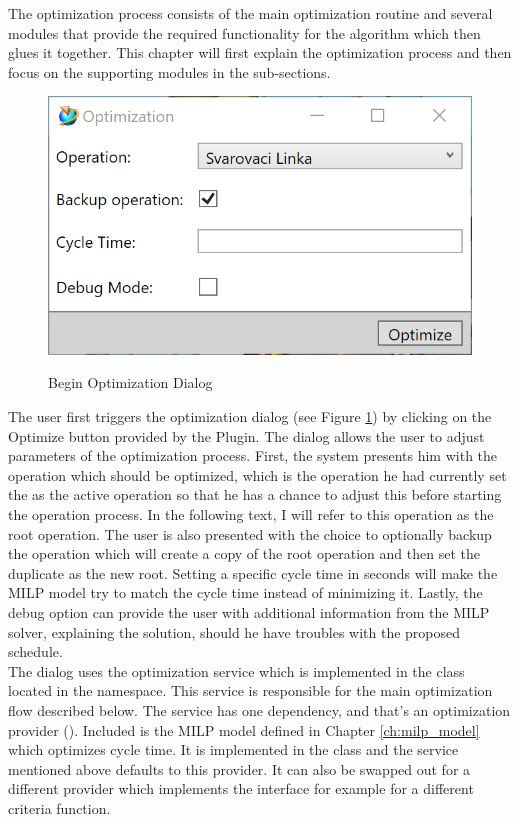 The optimization process consists of the main optimization routine and several modules that provide the required functionality for the algorithm which then glues it together. This chapter will first explain the optimization process and then focus on the supporting modules in the sub-sections. \\

\begin{figure}[ht]
	\caption{Begin Optimization Dialog}
	\centering
	\includegraphics{dialog_beginoptimization}
	\label{fig:DialogBeginOptimization}
\end{figure}

The user first triggers the optimization dialog (see Figure \ref{fig:DialogBeginOptimization}) by clicking on the Optimize button provided by the Plugin. 
The dialog allows the user to adjust parameters of the optimization process. 
First, the system presents him with the operation which should be optimized, which is the operation he had currently set the as the active operation so that he has a chance to adjust this before starting the operation process. In the following text, I will refer to this operation as the root operation.
The user is also presented with the choice to optionally backup the operation which will create a copy of the root operation and then set the duplicate as the new root.
Setting a specific cycle time in seconds will make the MILP model try to match the cycle time instead of minimizing it.
Lastly, the debug option can provide the user with additional information from the MILP solver, explaining the solution, should he have troubles with the proposed schedule. \\

The dialog uses the optimization service which is implemented in the  class located in the  namespace. This service is responsible for the main optimization flow described below. The service has one dependency, and that's an optimization provider (). Included is the MILP model defined in Chapter \ref{ch:milp_model} which optimizes cycle time. It is implemented in the  class and the service mentioned above defaults to this provider. It can also be swapped out for a different provider which implements the  interface for example for a different criteria function. \\

